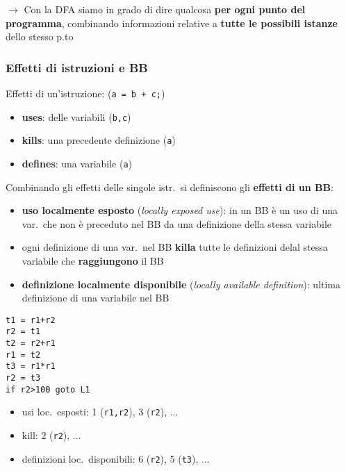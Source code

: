 \noindent $\rightarrow$ Con la DFA siamo in grado di dire qualcosa \textbf{per ogni punto del programma}, combinando informazioni relative a \textbf{tutte le possibili istanze} dello stesso p.to

\subsubsection{Effetti di istruzioni e BB}

Effetti di un'istruzione: (\lstinline|a = b + c;|)
\begin{itemize}
  \item \textbf{uses}: delle variabili (\lstinline|b,c|)
  \item \textbf{kills}: una precedente definizione (\lstinline|a|)
  \item \textbf{defines}: una variabile (\lstinline|a|)
\end{itemize}
Combinando gli effetti delle singole istr.~si definiscono gli \textbf{effetti di un BB}:
\begin{itemize}
  \item \textbf{uso localmente esposto} (\textit{locally exposed use}): in un BB \`e un uso di una var.~che non \`e preceduto nel BB da una definizione della stessa variabile
  \item ogni definizione di una var.~nel BB \textbf{killa} tutte le definizioni delal stessa variabile che \textbf{raggiungono} il BB
  \item \textbf{definizione localmente disponibile} (\textit{locally available definition}): ultima definizione di una variabile nel BB
\end{itemize}

\newpage
\begin{example}
  \noindent \begin{minipage}[c]{.45\textwidth}
    \begin{lstlisting}[numbers=right,numbersep=-10pt]
t1 = r1+r2
r2 = t1
t2 = r2+r1
r1 = t2
t3 = r1*r1
r2 = t3
if r2>100 goto L1\end{lstlisting}
\end{minipage}\hfill
\begin{minipage}[c]{.55\textwidth}
  \begin{itemize}
    \item usi loc.~esposti: 1 (\lstinline|r1,r2|), 3 (\lstinline|r2|), ...
    \item kill: 2 (\lstinline|r2|), ...
    \item definizioni loc.~disponibili: 6 (\lstinline|r2|), 5 (\lstinline|t3|), ...
  \end{itemize}
\end{minipage}
\end{example}

